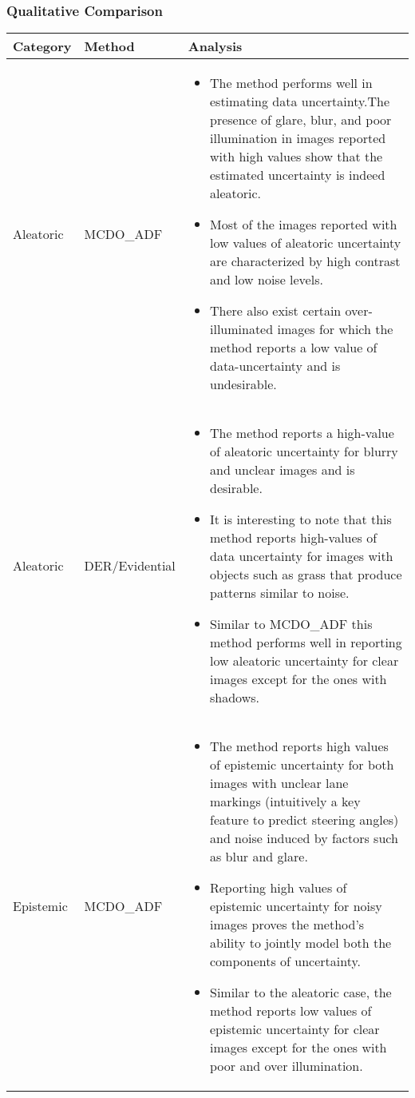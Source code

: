 \subsubsection{Qualitative Comparison}
\begin{table}[H]
\begin{tabular}[h]{|p{1.5cm}|p{2.3cm}|p{12.5cm}|}
\hline
\textbf{Category}&\textbf{Method}&\textbf{Analysis}\\
\hline
Aleatoric&MCDO\_ADF&\begin{itemize}\item The method performs well in estimating data uncertainty.The presence of glare, blur, and poor illumination in images reported with high values show that the estimated uncertainty is indeed aleatoric. \item Most of the images reported with low values of aleatoric uncertainty are characterized by high contrast and low noise levels. \item There also exist certain over-illuminated images for which the method reports a low value of data-uncertainty and is undesirable.\end{itemize}\\
\hline
Aleatoric&DER/Evidential&\begin{itemize}\item The method reports a high-value of aleatoric uncertainty for blurry and unclear images and is desirable.\item  It is interesting to note that this method reports high-values of data uncertainty for images with objects such as grass that produce patterns similar to noise.\item Similar to MCDO\_ADF this method performs well in reporting low aleatoric uncertainty for clear images except for the ones with shadows.\end{itemize}\\
\hline
Epistemic&MCDO\_ADF&\begin{itemize}\item The method reports high values of epistemic uncertainty for both images with unclear lane markings (intuitively a key feature to predict steering angles) and noise induced by factors such as blur and glare.\item Reporting high values of epistemic uncertainty for noisy images proves the method's ability to jointly model both the components of uncertainty.\item Similar to the aleatoric case, the method reports low values of epistemic uncertainty for clear images except for the ones with poor and over illumination.\end{itemize}\\

\end{tabular}
\end{table}
